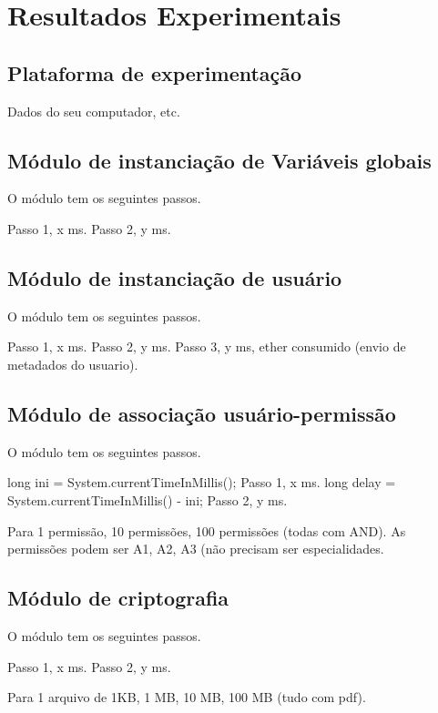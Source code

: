 \documentclass[a4paper,11pt]{article}
\begin{document}
\newpage
\section{Resultados Experimentais}

\subsection{Plataforma de experimentação}

Dados do seu computador, etc.

\subsection{Módulo de instanciação de Variáveis globais}

O módulo tem os seguintes passos.

Passo 1, x ms.
Passo 2, y ms.

\subsection{Módulo de instanciação de usuário}

O módulo tem os seguintes passos.

Passo 1, x ms.
Passo 2, y ms.
Passo 3, y ms, ether consumido (envio de metadados do usuario).

\subsection{Módulo de associação usuário-permissão}

O módulo tem os seguintes passos.

long ini = System.currentTimeInMillis();
Passo 1, x ms.
long delay = System.currentTimeInMillis() - ini;
Passo 2, y ms.

Para 1 permissão, 10 permissões, 100 permissões (todas com AND). As permissões podem ser A1, A2, A3 (não precisam ser especialidades.

\subsection{Módulo de criptografia}

O módulo tem os seguintes passos.

Passo 1, x ms.
Passo 2, y ms.

Para 1 arquivo de 1KB, 1 MB, 10 MB, 100 MB (tudo com pdf).
\end{document}
